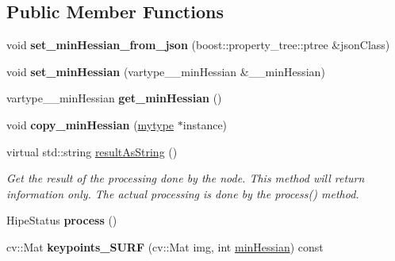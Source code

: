 \subsection*{Public Member Functions}
\begin{DoxyCompactItemize}
\item 
\mbox{\label{classfilter_1_1algos_1_1_surf_a23e0db44a116935d22a17a29774e3787}} 
void {\bfseries set\+\_\+min\+Hessian\+\_\+from\+\_\+json} (boost\+::property\+\_\+tree\+::ptree \&json\+Class)
\item 
\mbox{\label{classfilter_1_1algos_1_1_surf_ad0a91f391f5c64712f163b525065e48f}} 
void {\bfseries set\+\_\+min\+Hessian} (vartype\+\_\+\+\_\+min\+Hessian \&\+\_\+\+\_\+min\+Hessian)
\item 
\mbox{\label{classfilter_1_1algos_1_1_surf_afb6cea9f984a324a91519cc8f9703cd8}} 
vartype\+\_\+\+\_\+min\+Hessian {\bfseries get\+\_\+min\+Hessian} ()
\item 
\mbox{\label{classfilter_1_1algos_1_1_surf_a25c1f6aaa5f25e91278e98b8ab71c16d}} 
void {\bfseries copy\+\_\+min\+Hessian} (\hyperlink{classfilter_1_1algos_1_1_surf}{mytype} $\ast$instance)
\item 
virtual std\+::string \hyperlink{classfilter_1_1algos_1_1_surf_ad7aae2eb2e5a5f2a0277eb5d58153833}{result\+As\+String} ()
\begin{DoxyCompactList}\small\item\em Get the result of the processing done by the node. This method will return information only. The actual processing is done by the process() method. \end{DoxyCompactList}\item 
\mbox{\label{classfilter_1_1algos_1_1_surf_a28ded72116afffe457255e8d329a2e45}} 
Hipe\+Status {\bfseries process} ()
\item 
\mbox{\label{classfilter_1_1algos_1_1_surf_a42e04adb26eefa46190fe5a0c6862093}} 
cv\+::\+Mat {\bfseries keypoints\+\_\+\+S\+U\+RF} (cv\+::\+Mat img, int \hyperlink{classfilter_1_1algos_1_1_surf_a10c6204bfde9712b2a3b322dcd32d6c8}{min\+Hessian}) const
\end{DoxyCompactItemize}
